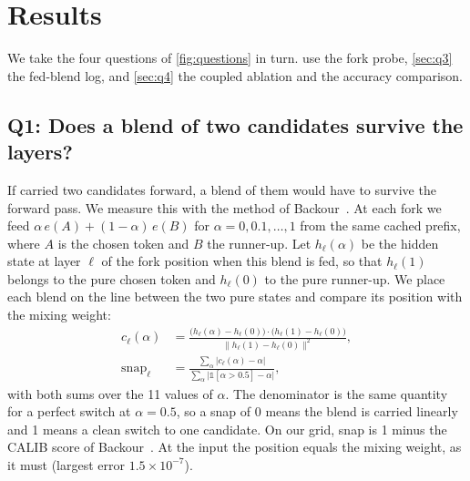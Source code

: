 \section{Results}\label{sec:results}

We take the four questions of \cref{fig:questions} in turn.
 use the fork probe, \cref{sec:q3} the fed-blend log, and \cref{sec:q4} the coupled ablation and
the accuracy comparison.

\subsection{Q1: Does a blend of two candidates survive the layers?}\label{sec:q1}

If \ST{} carried two candidates forward, a blend of them would have to survive the forward pass.
We measure this with the method of Backour~\cite{backour2026dynamics}.
At each fork we feed $\alpha\,e(A) + (1-\alpha)\,e(B)$ for $\alpha = 0, 0.1, \dots, 1$ from the same cached prefix, %
where $A$ is the chosen token and $B$ the runner-up.
Let $h_\ell(\alpha)$ be the hidden state at layer $\ell$ of the fork position when this blend is fed, so that
$h_\ell(1)$ belongs to the pure chosen token and $h_\ell(0)$ to the pure runner-up.
We place each blend on the line between the two pure states and compare its position with the mixing weight:
\begin{align}
c_\ell(\alpha) &= \frac{\big(h_\ell(\alpha) - h_\ell(0)\big)\cdot\big(h_\ell(1) - h_\ell(0)\big)}
                       {\lVert h_\ell(1) - h_\ell(0)\rVert^2}, \label{eq:position}\\ %
\mathrm{snap}_\ell &= \frac{\sum_\alpha \lvert c_\ell(\alpha) - \alpha\rvert}
                         {\sum_\alpha \lvert \mathbb{1}[\alpha > 0.5] - \alpha\rvert}, \label{eq:snap} %
\end{align}
with both sums over the 11 values of $\alpha$. %
The denominator is the same quantity for a perfect switch at $\alpha = 0.5$, so a snap of 0 means the blend is %
carried linearly and 1 means a clean switch to one candidate.
On our grid, snap is 1 minus the CALIB score of Backour~\cite{backour2026dynamics}.
At the input the position equals the mixing weight, as it must (largest error $1.5 \times 10^{-7}$). %

